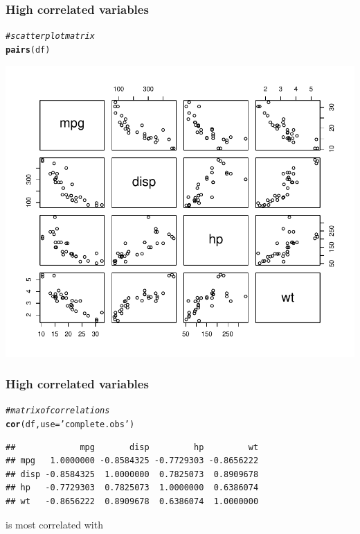 \documentclass[12pt]{beamer}\usepackage[]{graphicx}\usepackage[]{color}
\makeatletter
\newcommand{\hlstr}[1]{\textcolor[rgb]{0.192,0.494,0.8}{#1}}%
\newcommand{\hlcom}[1]{\textcolor[rgb]{0.678,0.584,0.686}{\textit{#1}}}%
\newcommand{\hlstd}[1]{\textcolor[rgb]{0.345,0.345,0.345}{#1}}%
\newcommand{\hlkwc}[1]{\textcolor[rgb]{0.333,0.667,0.333}{#1}}%
\newcommand{\hlkwd}[1]{\textcolor[rgb]{0.737,0.353,0.396}{\textbf{#1}}}%
\newenvironment{kframe}{%
 \def\at@end@of@kframe{}%
 \ifinner\ifhmode%
  \def\at@end@of@kframe{\end{minipage}}%
  \begin{minipage}{\columnwidth}%
 \fi\fi%
 \def\FrameCommand##1{\hskip\@totalleftmargin \hskip-\fboxsep
 \colorbox{shadecolor}{##1}\hskip-\fboxsep
     \hskip-\linewidth \hskip-\@totalleftmargin \hskip\columnwidth}%
 \MakeFramed {\advance\hsize-\width
   \@totalleftmargin\z@ \linewidth\hsize
   \@setminipage}}%
 {\par\unskip\endMakeFramed%
 \at@end@of@kframe}
\newenvironment{knitrout}{}{} %
\makeatother
\begin{document}
\begin{frame}[fragile]
\frametitle{High correlated variables}

\begin{knitrout}\footnotesize
{}\color{fgcolor}\begin{kframe}
\begin{alltt}
\hlcom{# scatterplot matrix}
\hlkwd{pairs}\hlstd{(df)}
\end{alltt}
\end{kframe}

{\centering \includegraphics[width=.7\linewidth,height=.6\linewidth]{figure/unnamed-chunk-26-1} 

}



\end{knitrout}

\end{frame}


\begin{frame}[fragile]
\frametitle{High correlated variables}

\begin{knitrout}\footnotesize
{}\color{fgcolor}\begin{kframe}
\begin{alltt}
\hlcom{# matrix of correlations}
\hlkwd{cor}\hlstd{(df,} \hlkwc{use} \hlstd{=} \hlstr{'complete.obs'}\hlstd{)}
\end{alltt}
\begin{verbatim}
##             mpg       disp         hp         wt
## mpg   1.0000000 -0.8584325 -0.7729303 -0.8656222
## disp -0.8584325  1.0000000  0.7825073  0.8909678
## hp   -0.7729303  0.7825073  1.0000000  0.6386074
## wt   -0.8656222  0.8909678  0.6386074  1.0000000
\end{verbatim}
\end{kframe}
\end{knitrout}

 is most correlated with 

\end{frame}
\end{document}

